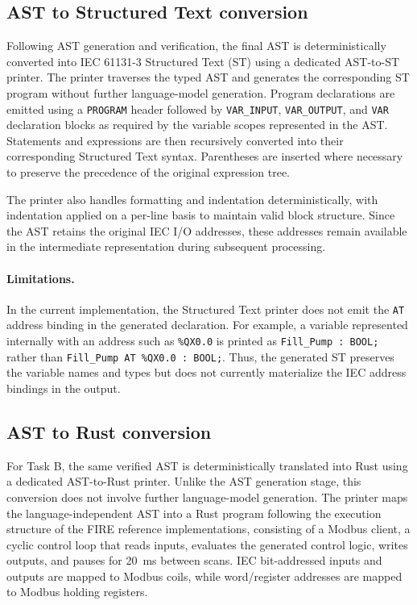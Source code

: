\documentclass{ceurart}
\begin{document}
\subsection{AST to Structured Text conversion}

Following AST generation and verification, the final AST is deterministically
converted into IEC 61131-3 Structured Text (ST) using a dedicated AST-to-ST
printer. The printer traverses the typed AST and generates the corresponding
ST program without further language-model generation. Program declarations are
emitted using a \texttt{PROGRAM} header followed by
\texttt{VAR\_INPUT}, \texttt{VAR\_OUTPUT}, and \texttt{VAR} declaration
blocks as required by the variable scopes represented in the AST. Statements
and expressions are then recursively converted into their corresponding
Structured Text syntax. Parentheses are inserted where necessary to preserve
the precedence of the original expression tree.

The printer also handles formatting and indentation deterministically, with
indentation applied on a per-line basis to maintain valid block structure.
Since the AST retains the original IEC I/O addresses, these addresses remain
available in the intermediate representation during subsequent processing.
\paragraph{Limitations. } In the current implementation, the Structured Text printer does not emit the \texttt{AT} address binding in the generated declaration. For example, a variable represented internally with an address such as
\texttt{\%QX0.0} is printed as \texttt{Fill\_Pump : BOOL;} rather than
\texttt{Fill\_Pump AT \%QX0.0 : BOOL;}. Thus, the generated ST preserves the
variable names and types but does not currently materialize the IEC address
bindings in the output.


\subsection{AST to Rust conversion}

For Task B, the same verified AST is deterministically translated into Rust using a dedicated AST-to-Rust printer. Unlike the AST generation stage, this conversion does not involve further language-model generation. The printer maps the language-independent AST into a Rust program following the execution structure of the FIRE reference implementations, consisting of a Modbus client, a cyclic control loop that reads inputs, evaluates the generated control logic, writes outputs, and pauses for 20~ms between scans. IEC bit-addressed inputs and outputs are mapped to Modbus coils, while word/register addresses are mapped to Modbus holding registers.
\end{document}
